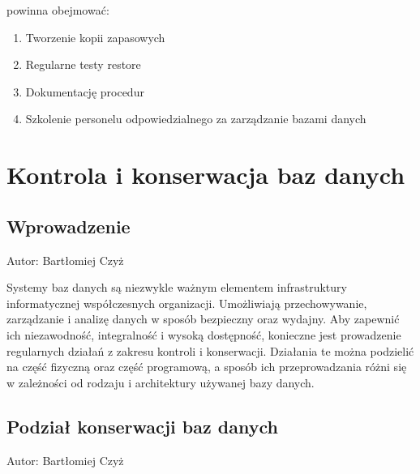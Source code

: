 \documentclass[a4paper,11pt,openany,english]{sphinxmanual}
\begin{document}
\sphinxAtStartPar
{} powinna obejmować:
\begin{enumerate}
%
\item {} 
\sphinxAtStartPar
Tworzenie kopii zapasowych

\item {} 
\sphinxAtStartPar
Regularne testy restore

\item {} 
\sphinxAtStartPar
Dokumentację procedur

\item {} 
\sphinxAtStartPar
Szkolenie personelu odpowiedzialnego za zarządzanie bazami danych

\end{enumerate}

\sphinxstepscope


\section{Kontrola i konserwacja baz danych}
\label{\detokenize{rozdzial2/Kontrola_i_konserwacja/kontrola_i_konserwacja:kontrola-i-konserwacja-baz-danych}}\label{\detokenize{rozdzial2/Kontrola_i_konserwacja/kontrola_i_konserwacja::doc}}

\subsection{Wprowadzenie}
\label{\detokenize{rozdzial2/Kontrola_i_konserwacja/kontrola_i_konserwacja:wprowadzenie}}
\sphinxAtStartPar
Autor: Bartłomiej Czyż

\sphinxAtStartPar
Systemy baz danych są niezwykle ważnym elementem infrastruktury informatycznej współczesnych organizacji. Umożliwiają przechowywanie, zarządzanie i analizę danych w sposób bezpieczny oraz wydajny. Aby zapewnić ich niezawodność, integralność i wysoką dostępność, konieczne jest prowadzenie regularnych działań z zakresu kontroli i konserwacji. Działania te można podzielić na część fizyczną oraz część programową, a sposób ich przeprowadzania różni się w zależności od rodzaju i architektury używanej bazy danych.


\subsection{Podział konserwacji baz danych}
\label{\detokenize{rozdzial2/Kontrola_i_konserwacja/kontrola_i_konserwacja:podzial-konserwacji-baz-danych}}
\sphinxAtStartPar
Autor: Bartłomiej Czyż
\end{document}
